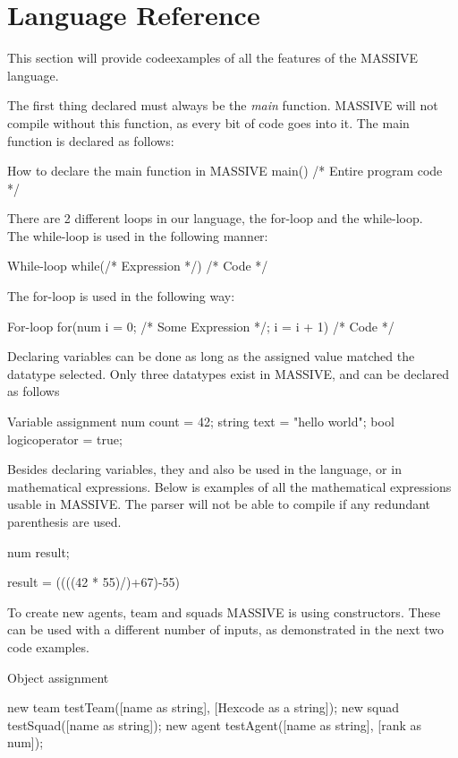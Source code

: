 \section{Language Reference}
\label{sec:language_reference}

This section will provide codeexamples of all the features of the MASSIVE language.

The first thing declared must always be the \textit{main} function. MASSIVE will not compile without this function, as every bit of code goes into it.
The main function is declared as follows:

\begin{source}{How to declare the main function in MASSIVE}{}
main()
{
		/* Entire program code */
}
\end{source}

There are 2 different loops in our language, the for-loop and the while-loop.\\
The while-loop is used in the following manner:
\begin{source}{While-loop}{}
while(/* Expression */)
{
		/* Code */
}
\end{source}

The for-loop is used in the following way:
\begin{source}{For-loop}{}
for(num i = 0; /* Some Expression */; i = i + 1)
{
		/* Code */
}
\end{source}

Declaring variables can be done as long as the assigned value matched the datatype selected. Only three datatypes exist in MASSIVE, and can be declared as follows

\begin{source}{Variable assignment}{}
num count = 42;
string text = "hello world";
bool logicoperator = true;
\end{source}

Besides declaring variables, they and also be used in the language, or in mathematical expressions. Below is examples of all the mathematical expressions usable in MASSIVE. The parser will not be able to compile if any redundant parenthesis are used.

\begin{source}{}{}
num result;

result = ((((42 * 55)/)+67)-55)

\end{source}

To create new agents, team and squads MASSIVE is using constructors. These can be used with a different number of inputs, as demonstrated in the next two code examples.
\begin{source}{Object assignment}{}

new team testTeam([name as string], [Hexcode as a string]);
new squad testSquad([name as string]);
new agent testAgent([name as string], [rank as num]);

\end{source}

